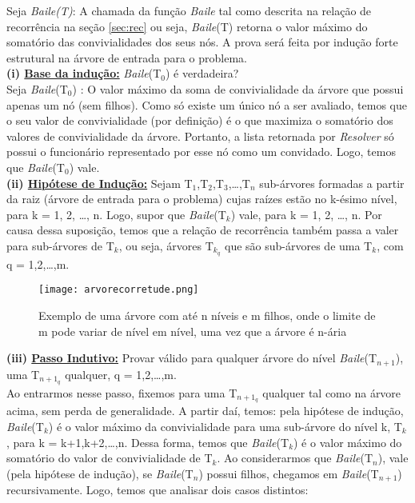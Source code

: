 \documentclass[a4paper]{article}
\begin{document}
Seja \emph{Baile(T)}: A chamada da função \emph{Baile} tal como descrita na relação de recorrência na seção \ref{sec:rec} ou seja, \emph{Baile}(T) retorna o valor máximo do somatório das convivialidades dos seus nós. A prova será feita por indução forte estrutural na árvore de entrada para o problema.\\

\textbf{(i) \underline{Base da indução:}} \emph{Baile}(T$_{0}$) é verdadeira?\\
\qquad Seja \emph{Baile}(T$_0$) : O valor máximo da soma de convivialidade da árvore que possui apenas um nó (sem filhos). Como só existe um único nó a ser avaliado, temos que o seu valor de convivialidade (por definição) é o que maximiza o somatório dos valores de convivialidade da árvore. Portanto, a lista retornada por \emph{Resolver} só possui o funcionário representado por esse nó como um convidado. Logo, temos que \emph{Baile}(T$_{0}$) vale.\\

\textbf{(ii) \underline{Hipótese de Indução:}} Sejam  T$_{1}$,T$_{2}$,T$_{3}$,\ldots,T$_{n}$ sub-árvores formadas a partir da raiz (árvore de entrada para o problema) cujas raízes estão no k-ésimo nível, para k = 1, 2, \ldots, n. Logo, supor que \emph{Baile}(T$_k$) vale, para k = 1, 2, \ldots, n. Por causa dessa suposição, temos que a relação de recorrência também passa a valer para sub-árvores de T$_k$, ou seja, árvores T$_{k_q}$ que são sub-árvores de uma T$_k$, com q = 1,2,\ldots,m.\\

\begin{figure}[!htb]
\centering
\texttt{[image: arvorecorretude.png]}
\caption{Exemplo de uma árvore com até n níveis e m filhos, onde o limite de m pode variar de nível em nível, uma vez que a árvore é n-ária}
\label{arvorecorretude}
\end{figure}

\textbf{(iii) \underline{Passo Indutivo:}} Provar válido para qualquer árvore do nível \emph{Baile}(T$_{n+1}$), uma T$_{n+1_q}$ qualquer, q = 1,2,\ldots,m.\\
Ao entrarmos nesse passo, fixemos para uma T$_{n+1_q}$ qualquer tal como na árvore acima, sem perda de generalidade. A partir daí, temos:
pela hipótese de indução, \emph{Baile}(T$_k$) é o valor máximo da convivialidade para uma sub-árvore do nível k, T$_{k}$, para k = k+1,k+2,\ldots,n. Dessa forma, temos que \emph{Baile}(T$_k$) é o valor máximo do somatório do valor de convivialidade de T$_k$. Ao considerarmos que \emph{Baile}(T$_n$), vale (pela hipótese de indução), se \emph{Baile}(T$_n$) possui filhos, chegamos em \emph{Baile}(T$_{n+1}$) recursivamente. Logo, temos que analisar dois casos distintos:
\end{document}
